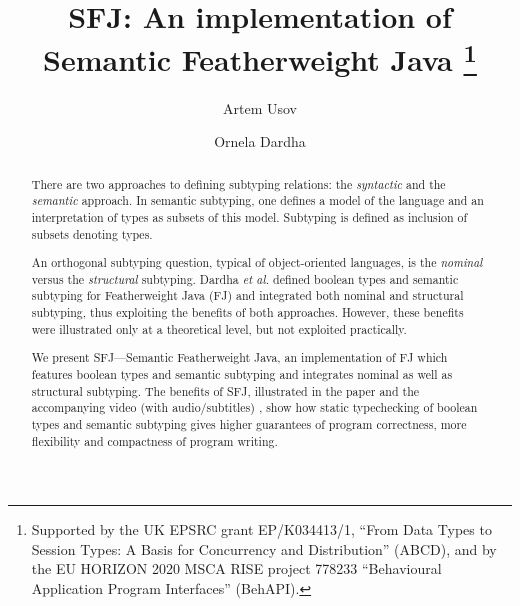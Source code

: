 \documentclass[runningheads]{llncs}
\begin{document}
\title{SFJ: An implementation of Semantic Featherweight Java
    \thanks{Supported by the UK EPSRC grant EP/K034413/1, ``From Data Types to Session Types: A Basis for Concurrency and Distribution'' (ABCD), and by the EU HORIZON 2020 MSCA RISE project 778233
    ``Behavioural Application Program Interfaces'' (BehAPI).}
}

\author{Artem Usov \and Ornela Dardha}


\maketitle

\begin{abstract}    
    There are two approaches to defining subtyping relations: the \emph{syntactic} and the \emph{semantic} approach.
    In semantic subtyping, one defines a model of the language and an interpretation of types as subsets of this model.
    Subtyping is defined as inclusion of subsets denoting types.
    
    An orthogonal subtyping question, typical of object-oriented languages, is the \emph{nominal} versus the \emph{structural} subtyping.
    Dardha \emph{et al.} \cite{Dardha2013,Dardha2017} defined boolean types and semantic subtyping for Featherweight Java (FJ) and integrated both nominal and structural subtyping, thus exploiting the benefits of both approaches.
    However, these benefits were illustrated only at a theoretical level, but not exploited practically.

    We present SFJ---Semantic Featherweight Java, an implementation of FJ which features boolean types and semantic subtyping and integrates nominal as well as structural subtyping.
    The benefits of SFJ, illustrated in the paper and the accompanying video (with audio/subtitles) \cite{UD20}, show how static typechecking of boolean types and semantic subtyping gives higher guarantees of program correctness, more flexibility and compactness of program writing.
\end{abstract}
\end{document}
